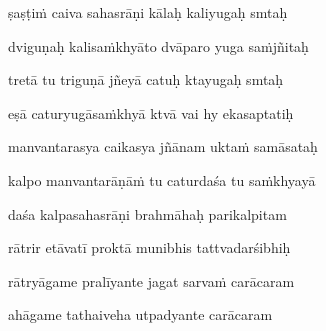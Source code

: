 ṣaṣṭiṁ caiva sahasrāṇi kālaḥ kaliyugaḥ smtaḥ\thinspace{\dandab} \dontdisplaylinenum

dviguṇaḥ kalisaṁkhyāto dvāparo yuga saṁjñitaḥ \veg\dontdisplaylinenum
{}

tretā tu triguṇā jñeyā catuḥ ktayugaḥ smtaḥ\thinspace{\dandab} \dontdisplaylinenum

eṣā caturyugāsaṁkhyā ktvā vai hy ekasaptatiḥ \veg\dontdisplaylinenum
{}

manvantarasya caikasya jñānam uktaṁ samāsataḥ\thinspace{\dandab} \dontdisplaylinenum

kalpo manvantarāṇāṁ tu caturdaśa tu saṁkhyayā \veg\dontdisplaylinenum
{}

daśa kalpasahasrāṇi brahmāhaḥ parikalpitam\thinspace{\dandab} \dontdisplaylinenum

rātrir etāvatī proktā munibhis tattvadarśibhiḥ \veg\dontdisplaylinenum
{}

rātryāgame pralīyante jagat sarvaṁ carācaram\thinspace{\dandab} \dontdisplaylinenum

ahāgame tathaiveha utpadyante carācaram \veg\dontdisplaylinenum
{}

